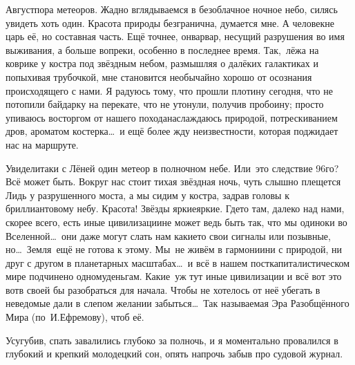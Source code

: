 Август\mdash пора метеоров. Жадно вглядываемся в безоблачное ночное небо, силясь увидеть хоть один. Красота природы безгранична, думается мне. А человек\mdash не царь её, но составная часть. Ещё точнее, он\mdash варвар, несущий разрушения во имя выживания, а больше вопреки, особенно в последнее время. Так,~лёжа на коврике у костра под звёздным небом, размышляя о далёких галактиках и попыхивая трубочкой, мне становится необычайно хорошо от осознания происходящего с нами. Я радуюсь тому, что прошли плотину сегодня, что не потопили байдарку на перекате, что не утонули, получив пробоину; просто упиваюсь восторгом от нашего похода\mdash наслаждаюсь природой, потрескиванием дров, ароматом костерка\ldots~и ещё более жду неизвестности, которая поджидает нас на маршруте.

Увидели\sdash таки с Лёней один метеор в полночном небе. Или~это следствие 96\sdash го? Всё может быть. Вокруг нас стоит тихая звёздная ночь, чуть слышно плещется Лидь у разрушенного моста, а мы сидим у костра, задрав головы к бриллиантовому небу. Красота! Звёзды яркие\sdash яркие. Где\sdash то там, далеко над нами, скорее всего, есть иные цивилизации\mdash не может ведь быть так, что мы одиноки во Вселенной\ldots~они даже могут слать нам какие\sdash то свои сигналы или позывные, но\ldots~Земля~ещё не готова к этому. Мы~не живём в гармонии\mdash ни с природой, ни друг с другом в планетарных масштабах\ldots~и всё в нашем посткапиталистическом мире подчинено одному\mdash деньгам. Какие~уж тут иные цивилизации и всё вот это вот\mdash в своей бы разобраться для начала. Чтобы не хотелось от неё убегать в неведомые дали в слепом желании забыться\ldots~Так называемая Эра Разобщённого Мира (по~И.Ефремову), чтоб её.

Усугубив, спать завалились глубоко за полночь, и я моментально провалился в глубокий и крепкий молодецкий сон, опять напрочь забыв про судовой журнал.

\begin{center}
\end{center}